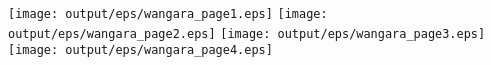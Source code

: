 \documentclass[11pt]{article}
\begin{document}
\begin{center}

\texttt{[image: output/eps/wangara\_page1.eps]}
\texttt{[image: output/eps/wangara\_page2.eps]}
\texttt{[image: output/eps/wangara\_page3.eps]}
\texttt{[image: output/eps/wangara\_page4.eps]}
\end{center}
\newpage
\end{document}
